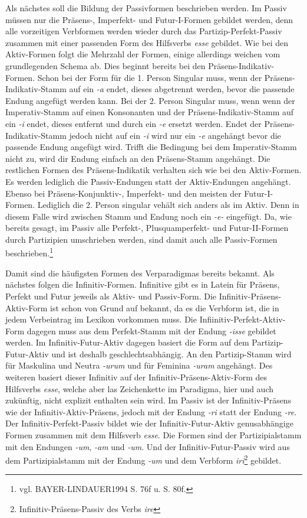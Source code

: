 \documentclass[12pt,abstract=on,titlepage,bibliography=totoc,ngerman,listof=totoc]{scrreprt}
\begin{document}
Als nächstes soll die Bildung der Passivformen beschrieben werden. Im Passiv müssen nur die Präsens-, Imperfekt- und Futur-I-Formen gebildet werden, denn alle vorzeitigen Verbformen werden wieder durch das Partizip-Perfekt-Passiv zusammen mit einer passenden Form des Hilfsverbs \textit{esse} gebildet. Wie bei den Aktiv-Formen folgt die Mehrzahl der Formen, einige allerdings weichen vom grundlegenden Schema ab. Dies beginnt bereits bei den Präsens-Indikativ-Formen. Schon bei der Form für die 1. Person Singular muss, wenn der Präsens-Indikativ-Stamm auf ein \textit{-a} endet, dieses abgetrennt werden, bevor die passende Endung angefügt werden kann. Bei der 2. Person Singular muss, wenn wenn der Imperativ-Stamm auf einen Konsonanten und der Präsens-Indikativ-Stamm auf ein \textit{-i} endet, dieses entfernt und durch ein \textit{-e} ersetzt werden. Endet der Präsens-Indikativ-Stamm jedoch nicht auf ein \textit{-i} wird nur ein \textit{-e} angehängt bevor die passende Endung angefügt wird. Trifft die Bedingung bei dem Imperativ-Stamm nicht zu, wird dir Endung einfach an den Präsens-Stamm angehängt. Die restlichen Formen des Präsens-Indikatik verhalten sich wie bei den Aktiv-Formen. Es werden lediglich die Passiv-Endungen statt der Aktiv-Endungen angehängt. Ebenso bei Präsens-Konjunktiv-, Imperfekt- und den meisten der Futur-I-Formen. Lediglich die 2. Person singular vehält sich anders als im Aktiv. Denn in diesem Falle wird zwischen Stamm und Endung noch ein \textit{-e-} eingefügt. Da, wie bereits gesagt, im Passiv alle Perfekt-, Plusquamperfekt- und Futur-II-Formen durch Partizipien umschrieben werden, sind damit auch alle Passiv-Formen beschrieben.\footnote{vgl. BAYER-LINDAUER1994 S. 76f u. S. 80f.} \par
Damit sind die häufigsten Formen des Verparadigmas bereits bekannt. Als nächstes folgen die Infinitiv-Formen. Infinitive gibt es in Latein für Präsens, Perfekt und Futur jeweils als Aktiv- und Passiv-Form. Die Infinitiv-Präsens-Aktiv-Form ist schon von Grund auf bekannt, da es die Verbform ist, die in jedem Verbeintrag im Lexikon vorkommen muss. Die Infiinitiv-Perfekt-Aktiv-Form dagegen muss aus dem Perfekt-Stamm mit der Endung \textit{-isse} gebildet werden. Im Infinitiv-Futur-Aktiv dagegen basiert die Form auf dem Partizip-Futur-Aktiv und ist deshalb geschlechtsabhängig. An den Partizip-Stamm wird für Maskulina und Neutra \textit{-urum} und für Feminina \textit{-uram} angehängt. Des weiteren basiert dieser Infinitiv auf der Infinitiv-Präsens-Aktiv-Form des Hilfsverbs \textit{esse}, welche aber las Zeichenkette im Paradigma, hier und auch zukünftig, nicht explizit enthalten sein wird. Im Passiv ist der Infinitiv-Präsens wie der Infinitiv-Aktiv-Präsens, jedoch mit der Endung \textit{-ri} statt der Endung \textit{-re}. Der Infinitiv-Perfekt-Passiv bildet wie der Infinitiv-Futur-Aktiv genusabhängige Formen zusammen mit dem Hilfsverb \textit{esse}. Die Formen sind der Partizipialstamm mit den Endungen \textit{-um}, \textit{-am} und \textit{-um}. Und der Infinitiv-Futur-Passiv wird aus dem Partizipialstamm mit der Endung \textit{-um} und dem Verbform \textit{iri}\footnote{Infinitiv-Präsens-Passiv des Verbs \textit{ire}} gebildet.\par
\end{document}

